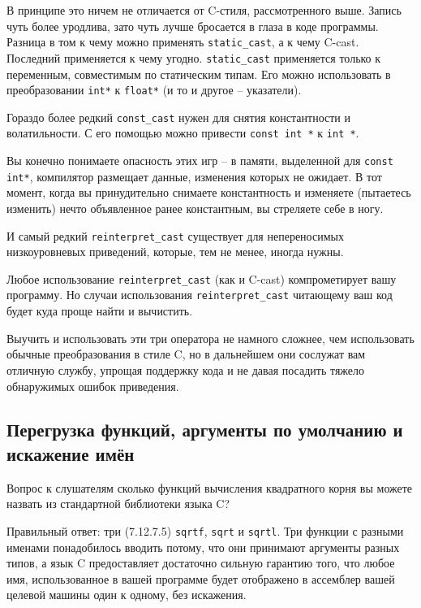 \documentclass[a4paper,12pt,oneside]{article}
\begin{document}


В принципе это ничем не отличается от C-стиля, рассмотренного выше. Запись чуть более уродлива, зато чуть лучше бросается в глаза в коде программы. Разница в том к чему можно применять \lstinline!static_cast!, а к чему C-cast. Последний применяется к чему угодно. \lstinline!static_cast! применяется только к переменным, совместимым по статическим типам. Его можно использовать в преобразовании \lstinline!int*! к \lstinline!float*! (и то и другое – указатели). 

Гораздо более редкий \lstinline!const_cast! нужен для снятия константности и волатильности. С его помощью можно привести \lstinline!const int *! к \lstinline!int *!. 



Вы конечно понимаете опасность этих игр – в памяти, выделенной для \lstinline!const int*!, компилятор размещает данные, изменения которых не ожидает. В тот момент, когда вы принудительно снимаете константность и изменяете (пытаетесь изменить) нечто объявленное ранее константным, вы стреляете себе в ногу.

И самый редкий \lstinline!reinterpret_cast! существует для непереносимых низкоуровневых приведений, которые, тем не менее, иногда нужны.



Любое использование \lstinline!reinterpret_cast! (как и C-cast) компрометирует вашу программу. Но случаи использования \lstinline!reinterpret_cast! читающему ваш код будет куда проще найти и вычистить.

Выучить и использовать эти три оператора не намного сложнее, чем использовать обычные преобразования в стиле C, но в дальнейшем они сослужат вам отличную службу, упрощая поддержку кода и не давая посадить тяжело обнаружимых ошибок приведения.

\subsection{Перегрузка функций, аргументы по умолчанию и искажение имён}\label{NameResolution}

Вопрос к слушателям сколько функций вычисления квадратного корня вы можете назвать из стандартной библиотеки языка C?

Правильный ответ: три (7.12.7.5) \lstinline!sqrtf!, \lstinline!sqrt! и \lstinline!sqrtl!. Три функции с разными именами понадобилось вводить потому, что они принимают аргументы разных типов, а язык C предоставляет достаточно сильную гарантию того, что любое имя, использованное в вашей программе будет отображено в ассемблер вашей целевой машины один к одному, без искажения.
\end{document}
